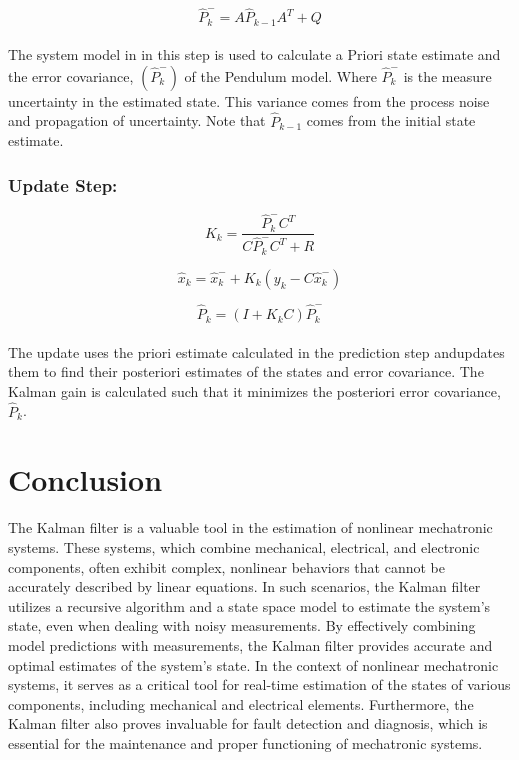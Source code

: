 \documentclass{article}
\begin{document}
\begin{equation}
\label{eq4}
\hat{P}^{-}_{k} = A \hat{P}_{k-1} A^{T} + Q
\end{equation}\\
The system model in in this step is used to calculate a Priori state estimate and the error covariance, $(\hat{P}^{-}_{k})$ of the Pendulum model. Where $\hat{P}^{-}_{k}$ is the measure uncertainty in the estimated state. This variance comes from the process noise and propagation of uncertainty. Note that $\hat{P}_{k-1}$ comes from the initial state estimate.\\

\subsubsection{Update Step:}
\begin{equation}
\label{eq5}
K_{k} = \dfrac{\hat{P}^{-}_{k} C^{T}}{C \hat{P}^{-}_{k} C^{T} + R}
\end{equation}

\begin{equation}
\label{eq6}
\hat{x}_{k} = \hat{x}^{-}_{k} + K_{k}(y_{k} - C \hat{x}^{-}_{k})
\end{equation}

\begin{equation}
\label{7}
\hat{P}_{k} = (I + K_{k} C) \hat{P}^{-}_{k}
\end{equation}\\

\indent The update uses the priori estimate calculated in the prediction step andupdates them to find their posteriori estimates of the states and error covariance. The Kalman gain is calculated such that it minimizes the posteriori error covariance, $\hat{P}_{k}$.

\section{Conclusion}

The Kalman filter is a valuable tool in the estimation of nonlinear mechatronic systems. These systems, which combine mechanical, electrical, and electronic components, often exhibit complex, nonlinear behaviors that cannot be accurately described by linear equations. In such scenarios, the Kalman filter utilizes a recursive algorithm and a state space model to estimate the system's state, even when dealing with noisy measurements. By effectively combining model predictions with measurements, the Kalman filter provides accurate and optimal estimates of the system's state. In the context of nonlinear mechatronic systems, it serves as a critical tool for real-time estimation of the states of various components, including mechanical and electrical elements. Furthermore, the Kalman filter also proves invaluable for fault detection and diagnosis, which is essential for the maintenance and proper functioning of mechatronic systems.
\end{document}
